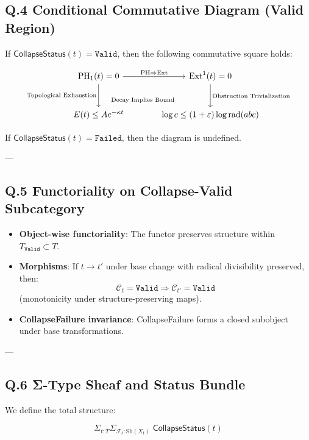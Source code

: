 \documentclass[11pt]{article}
\DeclareMathOperator{\Ext}{Ext}
\DeclareMathOperator{\PH}{PH}
\begin{document}
\subsection*{Q.4 Conditional Commutative Diagram (Valid Region)}

If \( \mathsf{CollapseStatus}(t) = \texttt{Valid} \), then the following commutative square holds:

\[
\begin{tikzcd}[row sep=large, column sep=large]
\PH_1(t) = 0
  \arrow[r, "\text{PH} \Rightarrow \Ext"]
  \arrow[d, swap, "\text{Topological Exhaustion}"]
& \Ext^1(t) = 0
  \arrow[d, "\text{Obstruction Trivialization}"] \\
E(t) \leq Ae^{-\kappa t}
  \arrow[r, "\text{Decay Implies Bound}" description, yshift=4.0ex]
& \log c \leq (1+\varepsilon)\log \mathrm{rad}(abc)
\end{tikzcd}
\]


If \( \mathsf{CollapseStatus}(t) = \texttt{Failed} \), then the diagram is undefined.

---

\subsection*{Q.5 Functoriality on Collapse-Valid Subcategory}

\begin{itemize}
  \item \textbf{Object-wise functoriality}: The functor preserves structure within \( T_{\texttt{Valid}} \subset T \).
  \item \textbf{Morphisms}: If \( t \to t' \) under base change with radical divisibility preserved,  
  then:
  \[
  \mathcal{C}_{t} = \texttt{Valid} \Rightarrow \mathcal{C}_{t'} = \texttt{Valid}
  \]
  (monotonicity under structure-preserving maps).
  \item \textbf{CollapseFailure invariance}: CollapseFailure forms a closed subobject under base transformations.
\end{itemize}

---

\subsection*{Q.6 Σ-Type Sheaf and Status Bundle}

We define the total structure:

\[
\Sigma_{t:T} \Sigma_{\mathcal{F}_t:\mathrm{Sh}(X_t)} \;
  \mathsf{CollapseStatus}(t)
\]
\end{document}
